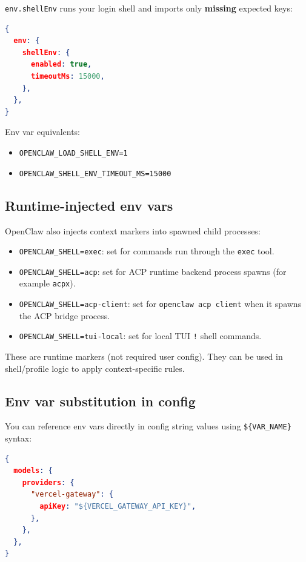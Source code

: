 \texttt{env.shellEnv} runs your login shell and imports only \textbf{missing} expected keys:

\begin{lstlisting}[language=json]
{
  env: {
    shellEnv: {
      enabled: true,
      timeoutMs: 15000,
    },
  },
}
\end{lstlisting}


Env var equivalents:

\begin{itemize}
  \item \texttt{OPENCLAW\_LOAD\_SHELL\_ENV=1}
  \item \texttt{OPENCLAW\_SHELL\_ENV\_TIMEOUT\_MS=15000}
\end{itemize}


\subsection{Runtime-injected env vars}


OpenClaw also injects context markers into spawned child processes:

\begin{itemize}
  \item \texttt{OPENCLAW\_SHELL=exec}: set for commands run through the \texttt{exec} tool.
  \item \texttt{OPENCLAW\_SHELL=acp}: set for ACP runtime backend process spawns (for example \texttt{acpx}).
  \item \texttt{OPENCLAW\_SHELL=acp-client}: set for \texttt{openclaw acp client} when it spawns the ACP bridge process.
  \item \texttt{OPENCLAW\_SHELL=tui-local}: set for local TUI \texttt{!} shell commands.
\end{itemize}


These are runtime markers (not required user config). They can be used in shell/profile logic
to apply context-specific rules.

\subsection{Env var substitution in config}


You can reference env vars directly in config string values using \texttt{\$\{VAR\_NAME\}} syntax:

\begin{lstlisting}[language=json]
{
  models: {
    providers: {
      "vercel-gateway": {
        apiKey: "${VERCEL_GATEWAY_API_KEY}",
      },
    },
  },
}
\end{lstlisting}


